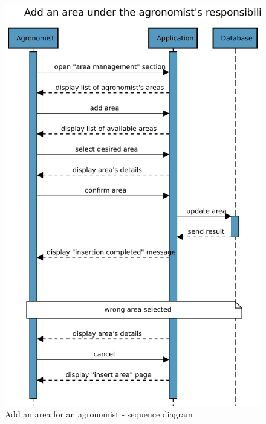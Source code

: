 \begin{figure}[H]
    \centering
    \includegraphics[scale=0.75]{Images/Sequence diagrams/Agronomist - add area.pdf}

    \caption{Add an area for an agronomist - sequence diagram}
    \label{fig:fig:seq_diag_insert_area}

    
\end{figure}


